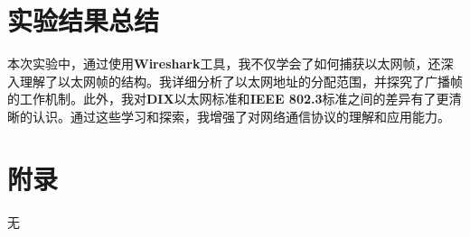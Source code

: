 \documentclass{article}
\begin{document}
	\section{实验结果总结}
	
	本次实验中，通过使用\textbf{Wireshark}工具，我不仅学会了如何捕获以太网帧，还深入理解了以太网帧的结构。我详细分析了以太网地址的分配范围，并探究了广播帧的工作机制。此外，我对\textbf{DIX}以太网标准和\textbf{IEEE 802.3}标准之间的差异有了更清晰的认识。通过这些学习和探索，我增强了对网络通信协议的理解和应用能力。
	
	\section{附录}
	
	无
	
\end{document}
